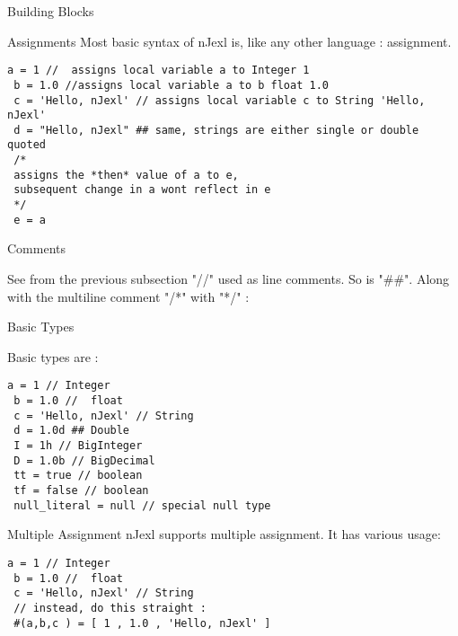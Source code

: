 \begin{section}{Building Blocks}
\begin{subsection}{Assignments}
Most basic syntax of nJexl is, like any other language : assignment.
\begin{center}
\begin{minipage}{\linewidth}
\begin{lstlisting}[style=JexlStyle]
 a = 1 //  assigns local variable a to Integer 1
 b = 1.0 //assigns local variable a to b float 1.0
 c = 'Hello, nJexl' // assigns local variable c to String 'Hello, nJexl'
 d = "Hello, nJexl" ## same, strings are either single or double quoted 
 /* 
 assigns the *then* value of a to e, 
 subsequent change in a wont reflect in e 
 */
 e = a 
\end{lstlisting}
\end{minipage}\end{center}
\end{subsection}

\begin{subsection}{Comments}

See from the previous subsection "//" used as line comments. So is "\#\#".
Along with the multiline comment "/*" with  "*/" :

\end{subsection}


\begin{subsection}{Basic Types}

Basic types are :
\begin{lstlisting}[style=JexlStyle]
 a = 1 // Integer 
 b = 1.0 //  float 
 c = 'Hello, nJexl' // String 
 d = 1.0d ## Double 
 I = 1h // BigInteger 
 D = 1.0b // BigDecimal  
 tt = true // boolean 
 tf = false // boolean 
 null_literal = null // special null type
\end{lstlisting}

\end{subsection}

\begin{subsection}{Multiple Assignment}
nJexl supports multiple assignment. It has various usage:

\begin{lstlisting}[style=JexlStyle]
 a = 1 // Integer 
 b = 1.0 //  float 
 c = 'Hello, nJexl' // String 
 // instead, do this straight :
 #(a,b,c ) = [ 1 , 1.0 , 'Hello, nJexl' ]   
\end{lstlisting}
\end{subsection}
\end{section}

